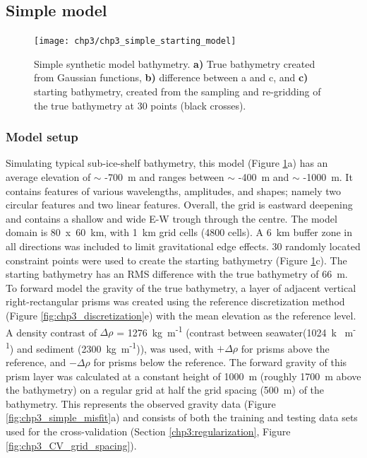 \subsection{Simple model}\label{chp3:simple_model}

 \begin{figure}[!ht]
    \centering
    \texttt{[image: chp3/chp3\_simple\_starting\_model]}
    \caption[Simple synthetic model bathymetry]{Simple synthetic model bathymetry. \textbf{a)} True bathymetry created from Gaussian functions, \textbf{b)} difference between a and c, and \textbf{c)} starting bathymetry, created from the sampling and re-gridding of the true bathymetry at 30 points (black crosses).}
    \label{fig:chp3_simple_starting_model}
\end{figure}

\subsubsection{Model setup}
Simulating typical sub-ice-shelf bathymetry, this model (Figure \ref{fig:chp3_simple_starting_model}a) has an average elevation of $\sim$ -700~m and ranges between $\sim$ -400~m and $\sim$ -1000~m. It contains features of various wavelengths, amplitudes, and shapes; namely two circular features and two linear features. Overall, the grid is eastward deepening and contains a shallow and wide E-W trough through the centre. The model domain is 80~x~60~km, with 1~km grid cells (4800 cells). A 6~km buffer zone in all directions was included to limit gravitational edge effects. 30 randomly located constraint points were used to create the starting bathymetry (Figure \ref{fig:chp3_simple_starting_model}c). The starting bathymetry has an RMS difference with the true bathymetry of 66~m. \\

To forward model the gravity of the true bathymetry, a layer of adjacent vertical right-rectangular prisms was created using the reference discretization method (Figure \ref{fig:chp3_discretization}e) with the mean elevation as the reference level. A density contrast of $\Delta\rho$ = 1276~kg~m\textsuperscript{-1} (contrast between seawater(1024~k~ m\textsuperscript{-1}) and sediment (2300~kg~m\textsuperscript{-1})), was used, with $+\Delta\rho$ for prisms above the reference, and $-\Delta\rho$ for prisms below the reference. The forward gravity of this prism layer was calculated at a constant height of 1000~m (roughly 1700~m above the bathymetry) on a regular grid at half the grid spacing (500~m) of the bathymetry. This represents the observed gravity data (Figure \ref{fig:chp3_simple_misfit}a) and consists of both the training and testing data sets used for the cross-validation (Section \ref{chp3:regularization}, Figure \ref{fig:chp3_CV_grid_spacing}). \\

